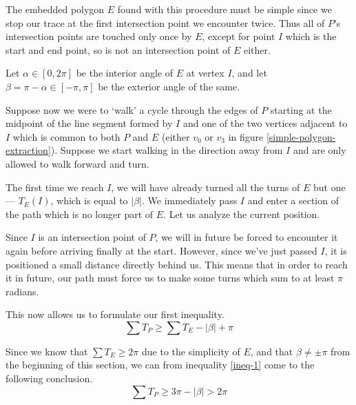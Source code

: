 \documentclass{article}
\begin{document}
The embedded polygon \(E\) found with this procedure must be simple since we stop our trace at the first intersection point we encounter twice. Thus all of \(P\)'s intersection points are touched only once by \(E\), except for point \(I\) which is the start and end point, so is not an intersection point of \(E\) either.

Let \(\alpha \in [0, 2\pi]\) be the interior angle of \(E\) at vertex \(I\), and let \(\beta = \pi - \alpha \in [-\pi, \pi]\) be the exterior angle of the same.

Suppose now we were to `walk' a cycle through the edges of \(P\) starting at the midpoint of the line segment formed by \(I\) and one of the two vertices adjacent to \(I\) which is common to both \(P\) and \(E\) (either \(v_0\) or \(v_3\) in figure \ref{simple-polygon-extraction}). Suppose we start walking in the direction away from \(I\) and are only allowed to walk forward and turn.

The first time we reach \(I\), we will have already turned all the turns of \(E\) but one --- \(T_E(I)\), which is equal to \(|\beta|\). We immediately pass \(I\) and enter a section of the path which is no longer part of \(E\). Let us analyze the current position.

Since \(I\) is an intersection point of \(P\), we will in future be forced to encounter it again before arriving finally at the start. However, since we've just passed \(I\), it is positioned a small distance directly behind us. This means that in order to reach it in future, our path must force us to make some turns which sum to at least \(\pi\) radians.

This now allows us to formulate our first inequality.
\begin{equation}
	\sum T_P \geq \sum T_E - |\beta| + \pi \label{ineq-1}
\end{equation}

Since we know that \(\sum T_E \geq 2\pi\) due to the simplicity of \(E\), and that \(\beta \neq \pm\pi\) from the beginning of this section, we can from inequality \ref{ineq-1} come to the following conclusion.
\begin{equation}
	\sum T_P \geq 3\pi - |\beta| > 2\pi
\end{equation}
\end{document}

